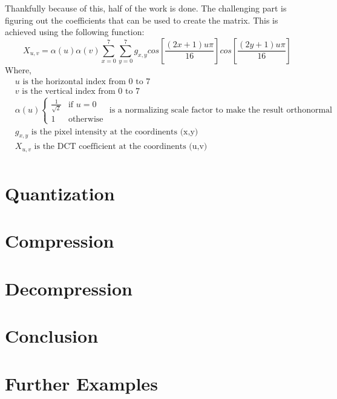 \documentclass[11pt]{article}
\begin{document}
Thankfully because of this, half of the work is done.
The challenging part is figuring out the coefficients that can be used to create the matrix.
This is achieved using the following function:
\begin{equation}
  \label{eqn:dct}
  X_{u,v} = \alpha(u) \alpha(v) \sum_{x=0}^{7} \sum_{y=0}^{7} g_{x,y} cos \left [  \frac{(2x+1)u\pi}{16} \right ] cos \left [  \frac{(2y+1)u\pi}{16} \right ]
\end{equation}
Where,
\begin{align*}
  &u \text{ is the horizontal index from 0 to 7} \\
  &v \text{ is the vertical index from 0 to 7} \\
  &\alpha(u) \left\{\begin{matrix}
    \frac{1}{\sqrt{2}} & \text{if } u=0 \\ 
    1 &  \text{otherwise}
  \end{matrix}\right. \text{ is a normalizing scale factor to make the result orthonormal} \\
  &g_{x,y} \text{ is the pixel intensity at the coordinents (x,y)} \\
  &X_{u,v} \text{ is the DCT coefficient at the coordinents (u,v)} \\
\end{align*}

\section{Quantization}
\label{sec: quantization}

\section{Compression}
\label{sec: compression}

\section{Decompression}
\label{sec: decompression}

\section{Conclusion}
\label{sec: conclusion}

\section{Further Examples}
\label{sec: furtherexamples}


%
\end{document}
